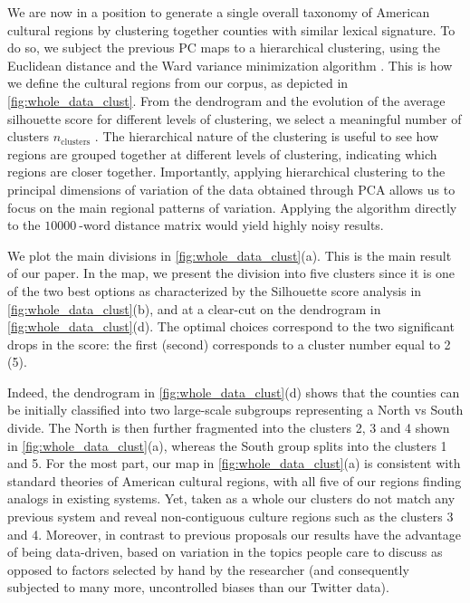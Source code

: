 \documentclass[../thesis.tex]{subfiles}
\begin{document}
We are now in a position to generate a single overall taxonomy of American cultural
regions by clustering together counties with similar lexical signature. To do so, we
subject the previous \ac{PC} maps to a hierarchical clustering, using the Euclidean
distance and the Ward variance minimization algorithm \cite{EverittClusterAnalysis2011}.
This is how we define the cultural regions from our corpus, as depicted in
\cref{fig:whole_data_clust}. From the dendrogram and the evolution of the average
silhouette score for different levels of clustering, we select a meaningful number of
clusters $n_{\text{clusters}}$ \cite{RousseeuwSilhouettesGraphical1987}. The
hierarchical nature of the clustering is useful to see how regions are grouped together
at different levels of clustering, indicating which regions are closer together.
Importantly, applying hierarchical clustering to the principal dimensions of variation
of the data obtained through \ac{PCA} allows us to focus on the main regional
patterns of variation. Applying the algorithm directly to the $\SI{10000}{}$-word
distance matrix would yield highly noisy results.

We plot the main divisions in \cref{fig:whole_data_clust}(a). This is the main result of
our paper. In the map, we present the division into five clusters since it is one of the
two best options as characterized by the Silhouette score analysis in
\cref{fig:whole_data_clust}(b), and at a clear-cut on the dendrogram in
\cref{fig:whole_data_clust}(d). The optimal choices correspond to the two significant
drops in the score: the first (second) corresponds to a cluster number equal to 2 (5). 

Indeed, the dendrogram in \cref{fig:whole_data_clust}(d) shows that the counties can be
initially classified into two large-scale subgroups representing a North vs South
divide. The North is then further fragmented into the clusters 2, 3 and 4 shown in
\cref{fig:whole_data_clust}(a), whereas the South group splits into the clusters 1 and
5. For the most part, our map in \cref{fig:whole_data_clust}(a) is consistent with
standard theories of American cultural regions, with all five of our regions finding
analogs in existing systems. Yet, taken as a whole our clusters do not match any
previous system and reveal non-contiguous culture regions such as the clusters 3 and 4.
Moreover, in contrast to previous proposals our results have the advantage of being
data-driven, based on variation in the topics people care to discuss as opposed to
factors selected by hand by the researcher (and consequently subjected to many more,
uncontrolled biases than our Twitter data).
\end{document}
